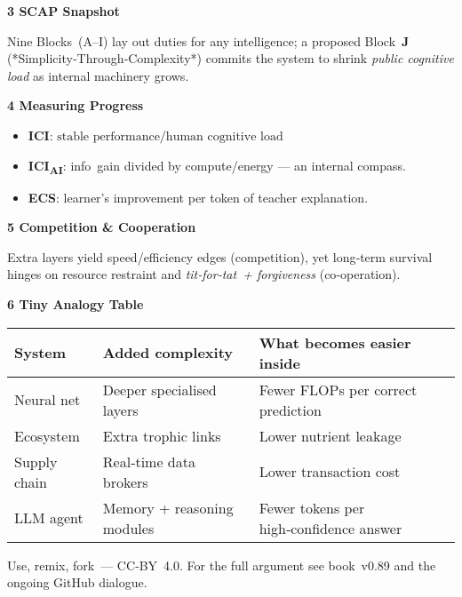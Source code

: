 \medskip
\noindent\textbf{3\; SCAP Snapshot}\par
Nine Blocks (A–I) lay out duties for any intelligence; a proposed Block \textbf{J} (*Simplicity‑Through‑Complexity*) commits the system to shrink \emph{public cognitive load} as internal machinery grows.

\medskip
\noindent\textbf{4\; Measuring Progress}\par
\begin{itemize}[leftmargin=*]
  \item \textbf{ICI}: \(\text{stable performance}/\text{human cognitive load}\)
  \item \textbf{ICI\textsubscript{AI}}: info gain divided by compute/energy — an internal compass.
  \item \textbf{ECS}: learner’s improvement per token of teacher explanation.
\end{itemize}

\medskip
\noindent\textbf{5\; Competition \& Cooperation}\par
Extra layers yield speed/efficiency edges (competition), yet long‑term survival hinges on resource restraint and \emph{tit‑for‑tat + forgiveness} (co‑operation).

\medskip
\noindent\textbf{6\; Tiny Analogy Table}\par
\begin{center}
\begin{tabular}{@{}p{3cm}p{4.5cm}p{5.2cm}@{}}
\toprule
\textbf{System} & \textbf{Added complexity} & \textbf{What becomes easier inside}\\
\midrule
Neural net & Deeper specialised layers & Fewer FLOPs per correct prediction\\
Ecosystem  & Extra trophic links & Lower nutrient leakage\\
Supply chain & Real‑time data brokers & Lower transaction cost\\
LLM agent & Memory + reasoning modules & Fewer tokens per high‑confidence answer\\
\bottomrule
\end{tabular}
\end{center}

\bigskip
\begin{center}\small
Use, remix, fork — CC‑BY 4.0.  For the full argument see book v0.89 and the ongoing GitHub dialogue.
\end{center}

